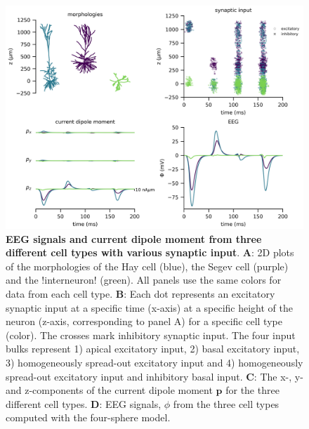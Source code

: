 \documentclass[preprint,10pt,authoryear]{elsarticle}
\newcommand{\sntxt}[1]{{\color{NavyBlue}#1}}
\begin{document}
\begin{figure}[H]
	\centering
	\includegraphics[width=1.0\textwidth]{fig_compare_neurons_l5ChC.png}
	\caption{\textbf{EEG signals and current dipole moment from three different cell types with various synaptic input}.
	\textbf{A}: 2D plots of the morphologies of the Hay cell (blue), the Segev cell (purple) and the \sntxt{!interneuron!} (green). All panels use the same colors for data from each cell type.
	\textbf{B}: Each dot represents an excitatory synaptic input at a specific time (x-axis) at a specific height of the neuron (z-axis, corresponding to panel A) for a specific cell type (color). The crosses mark inhibitory synaptic input. The four input bulks represent 1) apical excitatory input, 2) basal excitatory input, 3) homogeneously spread-out excitatory input and 4) homogeneously spread-out excitatory input and inhibitory basal input.
	\textbf{C}: The x-, y- and z-components of the current dipole moment $\mathbf{p}$ for the three different cell types.
	\textbf{D}: EEG signals, $\phi$ from the three cell types computed with the four-sphere model.
	}
	\label{fig:eeg_compare_cell_types}
\end{figure}
\end{document}
